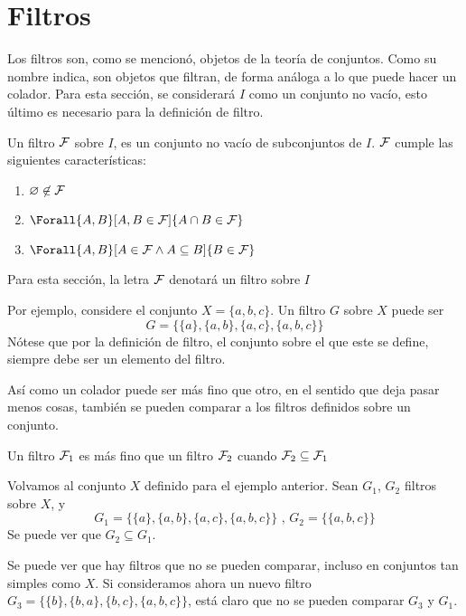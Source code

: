 \section{Filtros}

Los filtros son, como se mencionó, objetos de la teoría de conjuntos.
Como su nombre indica, son objetos que filtran, de forma análoga a lo que
puede hacer un colador. Para esta sección, se considerará $I$ como un
conjunto no vacío, esto último es necesario para la definición de filtro.

\begin{definition}\label{def:filtro}
  Un filtro $\mathcal{F}$ sobre $I$, es un conjunto no vacío de subconjuntos de $I$.
  $\mathcal{F}$ cumple las siguientes características:
  \begin{enumerate}
    \item $\varnothing \not\in \mathcal{F}$
    \item $\Forall{A,B}[A,B \in \F]{A\cap B \in \F}$
    \item $\Forall{A,B}[A\in \F \land A \subseteq B]{B \in \F}$
  \end{enumerate}

  Para esta sección, la letra $\mathcal{F}$ denotará un filtro sobre $I$
\end{definition}

Por ejemplo, considere el conjunto $X=\{a,b,c\}$. Un filtro $G$ sobre $X$
puede ser 
\[G = \{\{a\}, \{a,b\}, \{a,c\}, \{a,b,c\}\}\]
Nótese que por la definición de filtro, el conjunto sobre el que este se
define, siempre debe ser un elemento del filtro.

Así como un colador puede ser más fino que otro, en el sentido que
deja pasar menos cosas, también se pueden comparar a los filtros definidos
sobre un conjunto.

\begin{definition}
  Un filtro $\mathcal{F}_1$ es más fino que un filtro $\mathcal{F}_2$ cuando $\mathcal{F}_2 \subseteq \mathcal{F}_1$
\end{definition}

Volvamos al conjunto $X$ definido para el ejemplo anterior. Sean $G_1$, $G_2$
filtros sobre $X$, y
\[G_1 = \{\{a\}, \{a,b\},\{a,c\},\{a,b,c\}\}\text{ , } G_2 = \{\{a,b,c\}\}\]
Se puede ver que $G_2 \subseteq G_1$.

Se puede ver que hay filtros que no se pueden comparar, incluso en conjuntos tan
simples como $X$. Si consideramos ahora un nuevo filtro\\
$G_3 = \{\{b\}, \{b,a\},\{b,c\},\{a,b,c\}\}$, está claro que no se pueden comparar
$G_3$ y $G_1$.

